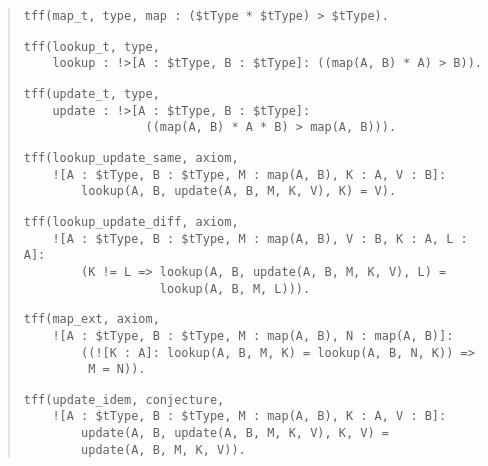 \begin{quote}
\verb+tff(map_t, type, map : ($tType * $tType) > $tType).+
\par\smallskip
\verb+tff(lookup_t, type,+\\
\verb+    lookup : !>[A : $tType, B : $tType]: ((map(A, B) * A) > B)).+\kern-10mm
\par\smallskip
\pagebreak[1] %
\verb+tff(update_t, type,+\\
\verb+    update : !>[A : $tType, B : $tType]:+\\
\verb+                 ((map(A, B) * A * B) > map(A, B))).+
\par\medskip\smallskip %
\pagebreak[2] %
\verb+tff(lookup_update_same, axiom,+\\
\verb+    ![A : $tType, B : $tType, M : map(A, B), K : A, V : B]:+\\
\verb+        lookup(A, B, update(A, B, M, K, V), K) = V).+
\par\smallskip
\pagebreak[1] %
\verb+tff(lookup_update_diff, axiom,+\\
\verb+    ![A : $tType, B : $tType, M : map(A, B), V : B, K : A, L : A]:+\kern-10mm\\
\verb+        (K != L => lookup(A, B, update(A, B, M, K, V), L) =+\\
\verb+                   lookup(A, B, M, L))).+
\par\smallskip
\pagebreak[1] %
\verb+tff(map_ext, axiom,+\\
\verb+    ![A : $tType, B : $tType, M : map(A, B), N : map(A, B)]:+\\
\verb+        ((![K : A]: lookup(A, B, M, K) = lookup(A, B, N, K)) =>+\kern-10mm\\
\verb+         M = N)).+
\par\medskip\smallskip %
\pagebreak[2] %
\verb+tff(update_idem, conjecture,+\\
\verb+    ![A : $tType, B : $tType, M : map(A, B), K : A, V : B]:+\\
\verb+        update(A, B, update(A, B, M, K, V), K, V) =+\\
\verb+        update(A, B, M, K, V)).+
\end{quote}
